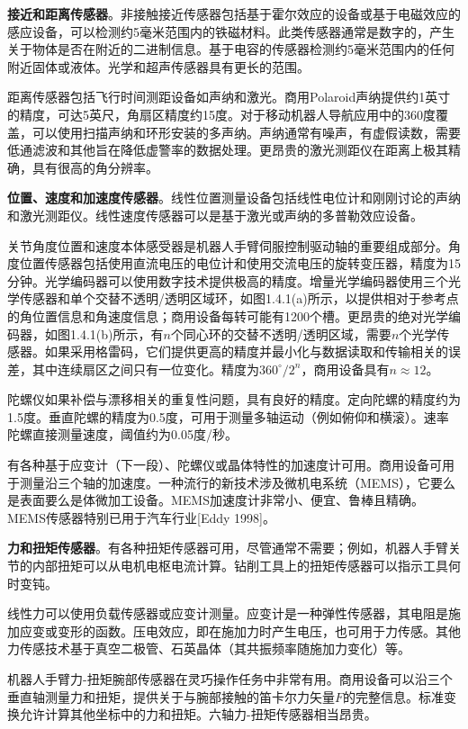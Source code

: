 \documentclass[UTF8,a4paper]{ctexart}
\begin{document}
\textbf{接近和距离传感器}。非接触接近传感器包括基于霍尔效应的设备或基于电磁效应的感应设备，可以检测约5毫米范围内的铁磁材料。此类传感器通常是数字的，产生关于物体是否在附近的二进制信息。基于电容的传感器检测约5毫米范围内的任何附近固体或液体。光学和超声传感器具有更长的范围。

距离传感器包括飞行时间测距设备如声纳和激光。商用Polaroid声纳提供约1英寸的精度，可达5英尺，角扇区精度约15度。对于移动机器人导航应用中的360度覆盖，可以使用扫描声纳和环形安装的多声纳。声纳通常有噪声，有虚假读数，需要低通滤波和其他旨在降低虚警率的数据处理。更昂贵的激光测距仪在距离上极其精确，具有很高的角分辨率。

\textbf{位置、速度和加速度传感器}。线性位置测量设备包括线性电位计和刚刚讨论的声纳和激光测距仪。线性速度传感器可以是基于激光或声纳的多普勒效应设备。

关节角度位置和速度本体感受器是机器人手臂伺服控制驱动轴的重要组成部分。角度位置传感器包括使用直流电压的电位计和使用交流电压的旋转变压器，精度为15分钟。光学编码器可以使用数字技术提供极高的精度。增量光学编码器使用三个光学传感器和单个交替不透明/透明区域环，如图1.4.1(a)所示，以提供相对于参考点的角位置信息和角速度信息；商用设备每转可能有1200个槽。更昂贵的绝对光学编码器，如图1.4.1(b)所示，有$n$个同心环的交替不透明/透明区域，需要$n$个光学传感器。如果采用格雷码，它们提供更高的精度并最小化与数据读取和传输相关的误差，其中连续扇区之间只有一位变化。精度为$360^\circ/2^n$，商用设备具有$n\approx 12$。

陀螺仪如果补偿与漂移相关的重复性问题，具有良好的精度。定向陀螺的精度约为1.5度。垂直陀螺的精度为0.5度，可用于测量多轴运动（例如俯仰和横滚）。速率陀螺直接测量速度，阈值约为0.05度/秒。

有各种基于应变计（下一段）、陀螺仪或晶体特性的加速度计可用。商用设备可用于测量沿三个轴的加速度。一种流行的新技术涉及微机电系统（MEMS），它要么是表面要么是体微加工设备。MEMS加速度计非常小、便宜、鲁棒且精确。MEMS传感器特别已用于汽车行业[Eddy 1998]。

\textbf{力和扭矩传感器}。有各种扭矩传感器可用，尽管通常不需要；例如，机器人手臂关节的内部扭矩可以从电机电枢电流计算。钻削工具上的扭矩传感器可以指示工具何时变钝。

线性力可以使用负载传感器或应变计测量。应变计是一种弹性传感器，其电阻是施加应变或变形的函数。压电效应，即在施加力时产生电压，也可用于力传感。其他力传感技术基于真空二极管、石英晶体（其共振频率随施加力变化）等。

机器人手臂力-扭矩腕部传感器在灵巧操作任务中非常有用。商用设备可以沿三个垂直轴测量力和扭矩，提供关于与腕部接触的笛卡尔力矢量$F$的完整信息。标准变换允许计算其他坐标中的力和扭矩。六轴力-扭矩传感器相当昂贵。
\end{document}

